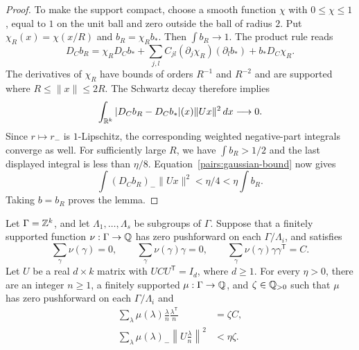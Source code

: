\begin{proof}
To make the support compact, choose a smooth function $\chi$ with
$0\leq\chi\leq1$, equal to $1$ on the unit ball and zero outside the
ball of radius $2$. Put $\chi_R(x)=\chi(x/R)$ and $b_R=\chi_Rb_*$.
Then $\int b_R\to1$. The product rule reads
\[
 D_Cb_R=\chi_R D_Cb_*
  +\sum_{j,l}C_{jl}(\partial_j\chi_R)(\partial_lb_*)
  +b_*D_C\chi_R.
\]
The derivatives of $\chi_R$ have bounds of orders $R^{-1}$ and $R^{-2}$
and are supported where $R\leq\|x\|\leq2R$. The Schwartz decay therefore
implies
\[
 \int_{\mathbb R^k}|D_Cb_R-D_Cb_*|(x)\|Ux\|^2\,dx\longrightarrow0.
\]
Since $r\mapsto r_-$ is $1$-Lipschitz, the corresponding weighted
negative-part integrals converge as well. For sufficiently large $R$,
we have $\int b_R>1/2$ and the last displayed integral is less than
$\eta/8$. Equation~\eqref{pairs:gaussian-bound} now gives
\[
 \int(D_Cb_R)_-\|Ux\|^2<\eta/4<\eta\int b_R.
\]
Taking $b=b_R$ proves the lemma.
\end{proof}

\begin{lemma}\label{pairs:rational}
Let $\Gamma=\mathbb Z^k$, and let $\Lambda_1,\ldots,\Lambda_s$ be subgroups
of $\Gamma$. Suppose that a finitely supported function
$\nu:\Gamma\to\mathbb Q$ has zero pushforward on each $\Gamma/\Lambda_i$,
and satisfies
\[
 \sum_\gamma\nu(\gamma)=0,
 \qquad \sum_\gamma\nu(\gamma)\gamma=0,
 \qquad \sum_\gamma\nu(\gamma)\gamma\gamma^{\mathsf T}=C.
\]
Let $U$ be a real $d\times k$ matrix with $UCU^{\mathsf T}=I_d$,
where $d\geq1$. For every $\eta>0$, there are an integer $n\geq1$,
a finitely supported $\mu:\Gamma\to\mathbb Q$, and $\zeta\in\mathbb Q_{>0}$ such
that $\mu$ has zero pushforward on each $\Gamma/\Lambda_i$ and
\begin{align}
 \sum_\lambda\mu(\lambda)
       \frac{\lambda}{n}\frac{\lambda^{\mathsf T}}{n}
   &=\zeta C, \label{pairs:exact-moment}\\
 \sum_\lambda\mu(\lambda)_-
       \left\|U\frac{\lambda}{n}\right\|^2
   &<\eta\zeta. \label{pairs:small-negative}
\end{align}
\end{lemma}

